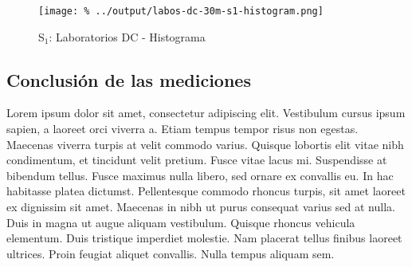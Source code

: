 \documentclass[final,inline,a4paper,narroweqnarray]{ieee}
\begin{document}
    \begin{figure}[ht]\begin{center}
      \texttt{[image: \%
      ../output/labos-dc-30m-s1-histogram.png]}
      \caption{S$_1$: Laboratorios DC - Histograma}
      \label{labos-dc-30m-s1-histogram}
    \end{center}\end{figure}


  \subsection{Conclusión de las mediciones}

Lorem ipsum dolor sit amet, consectetur adipiscing elit. Vestibulum cursus ipsum sapien, a laoreet orci viverra a. Etiam tempus tempor risus non egestas. Maecenas viverra turpis at velit commodo varius. Quisque lobortis elit vitae nibh condimentum, et tincidunt velit pretium. Fusce vitae lacus mi. Suspendisse at bibendum tellus. Fusce maximus nulla libero, sed ornare ex convallis eu. In hac habitasse platea dictumst. Pellentesque commodo rhoncus turpis, sit amet laoreet ex dignissim sit amet. Maecenas in nibh ut purus consequat varius sed at nulla. Duis in magna ut augue aliquam vestibulum. Quisque rhoncus vehicula elementum. Duis tristique imperdiet molestie. Nam placerat tellus finibus laoreet ultrices. Proin feugiat aliquet convallis. Nulla tempus aliquam sem.
\end{document}
